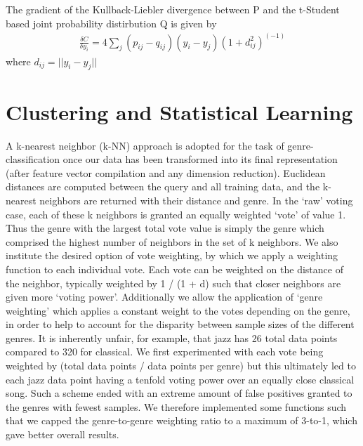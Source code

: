 \documentclass[10pt]{article}
\begin{document}
The gradient of the Kullback-Liebler divergence between P and the t-Student based joint probability distirbution Q is given by
\begin{align}
\frac{\delta C}{\delta y_i} =  4 \sum_j (p_{ij} - q_{ij})(y_i - y_j)(1 + d_{ij}^2)^(-1)\label{eq:Grad_KL_tsne}
\end{align} where $d_{ij} = ||y_i - y_j||$

\section{Clustering and Statistical Learning}

A k-nearest neighbor (k-NN) approach is adopted for the task of genre-classification once our data has been transformed into its final representation (after feature vector compilation and any dimension reduction).  Euclidean distances are computed between the query and all training data, and the k-nearest neighbors are returned with their distance and genre.  In the ‘raw’ voting case, each of these k neighbors is granted an equally weighted ‘vote’ of value 1.  Thus the genre with the largest total vote value is simply the genre which comprised the highest number of neighbors in the set of k neighbors.  We also institute the desired option of vote weighting, by which we apply a weighting function to each individual vote.  Each vote can be weighted on the distance of the neighbor, typically weighted by 1 / (1 + d) such that closer neighbors are given more ‘voting power’.  Additionally we allow the application of ‘genre weighting’ which applies a constant weight to the votes depending on the genre, in order to help to account for the disparity between sample sizes of the different genres.  It is inherently unfair, for example, that jazz has 26 total data points compared to 320 for classical.  We first experimented with each vote being weighted by (total data points / data points per genre) but this ultimately led to each jazz data point having a tenfold voting power over an equally close classical song.  Such a scheme ended with an extreme amount of false positives granted to the genres with fewest samples.  We therefore implemented some functions such that we capped the genre-to-genre weighting ratio to a maximum of 3-to-1, which gave better overall results.  



\end{document}
